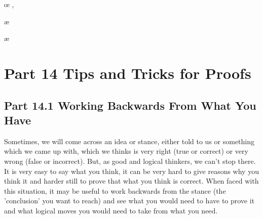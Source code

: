 \begin{fitchproof}
 
\end{fitchproof}

\begin{fitchproof}
 
\end{fitchproof}

\begin{fitchproof}
\by{\_}{ , }
\end{fitchproof}

\begin{fitchproof}
\oe{ , }
\end{fitchproof}

\begin{fitchproof}
\ae{ }
\end{fitchproof}

\begin{fitchproof}
\ae{ }
\ce{,}
\end{fitchproof}

\chapter{Part 14 Tips and Tricks for Proofs}
\section{Part 14.1 Working Backwards From What You Have}
Sometimes, we will come across an idea or stance, either told to us or something which we came up with, which we thinks is very right (true or correct) or very wrong (false or incorrect). But, as good and logical thinkers, we can't stop there. It is very easy to say what you think, it can be very hard to give reasons why you think it and harder still to prove that what you think is correct. When faced with this situation, it may be useful to work backwards from the stance (the 'conclusion' you want to reach) and see what you would need to have to prove it and what logical moves you would need to take from what you need. 

